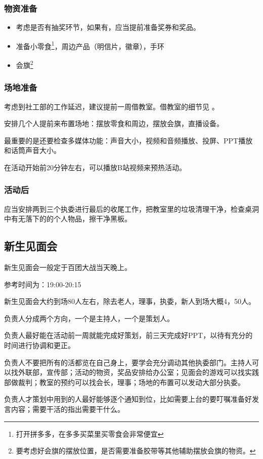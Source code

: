 \documentclass{ctexbook}
\begin{document}
\subsubsection{物资准备}
\begin{itemize}
    \item 考虑是否有抽奖环节，如果有，应当提前准备奖券和奖品。
    \item 准备小零食\footnote{打开拼多多，在多多买菜里买零食会非常便宜}，周边产品（明信片，徽章），手环
    \item 会旗\footnote{要考虑好会旗的摆放位置，是否需要准备胶带等其他辅助摆放会旗的物资。}
\end{itemize}
\subsubsection{场地准备}
考虑到社工部的工作延迟，建议提前一周借教室。借教室的细节见 \pageref{sec:借教室}。

安排几个人提前来布置场地：摆放零食和周边，摆放会旗，直播设备。

最重要的是还要检查多媒体功能：声音大小，视频和音频播放、投屏、PPT播放和话筒声音大小。

在活动开始前20分钟左右，可以播放B站视频来预热活动。

\subsubsection{活动后}
应当安排两到三个执委进行最后的收尾工作，把教室里的垃圾清理干净，检查桌洞中有无落下的的个人物品，擦干净黑板。
\subsection{新生见面会}
新生见面会一般定于百团大战当天晚上。

参考时间为：19:00-20:15

新生见面会大约到场80人左右，除去老人，理事，执委，新人到场大概4，50人。

负责人分成两个方向，一个是主持人，一个是策划人。

负责人最好能在活动前一周就能完成好策划，前三天完成好PPT，以待有充分的时间进行协调和更正。

负责人不要把所有的活都览在自己身上，要学会充分调动其他执委部门。主持人可以找外联部，宣传部；活动的物资，奖品安排给办公室；见面会的游戏可以找实践部做裁判；教室的预约可以找会长，理事；场地的布置可以发动大部分执委。

负责人才策划中用到的人最好能够逐个通知到位，比如需要上台的要叮嘱准备好发言内容；需要干活的指出需要干什么。
\end{document}

